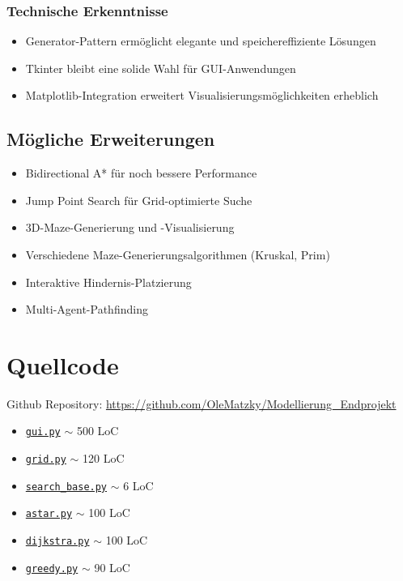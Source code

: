 \documentclass[12pt,a4paper]{article}
\begin{document}
\subsubsection{Technische Erkenntnisse}
\begin{itemize}
    \item Generator-Pattern ermöglicht elegante und speichereffiziente Lösungen
    \item Tkinter bleibt eine solide Wahl für GUI-Anwendungen
    \item Matplotlib-Integration erweitert Visualisierungsmöglichkeiten erheblich
\end{itemize}

\subsection{Mögliche Erweiterungen}
\begin{itemize}
    \item Bidirectional A* für noch bessere Performance
    \item Jump Point Search für Grid-optimierte Suche
    \item 3D-Maze-Generierung und -Visualisierung
    \item Verschiedene Maze-Generierungsalgorithmen (Kruskal, Prim)
    \item Interaktive Hindernis-Platzierung
    \item Multi-Agent-Pathfinding
\end{itemize}

\newpage
\appendix

\section{Quellcode}
Github Repository: \url{https://github.com/OleMatzky/Modellierung_Endprojekt}
\begin{itemize}
    \item \href{https://github.com/OleMatzky/Modellierung_Endprojekt/blob/main/Code/gui.py}{\texttt{gui.py}} $\sim$ 500 LoC
    \item \href{https://github.com/OleMatzky/Modellierung_Endprojekt/blob/main/Code/source/grid.py}{\texttt{grid.py}} $\sim$ 120 LoC
    \item \href{https://github.com/OleMatzky/Modellierung_Endprojekt/blob/main/Code/source/search_base.py}{\texttt{search\_base.py}} $\sim$ 6 LoC
    \item \href{https://github.com/OleMatzky/Modellierung_Endprojekt/blob/main/Code/source/astar.py}{\texttt{astar.py}} $\sim$ 100 LoC
    \item \href{https://github.com/OleMatzky/Modellierung_Endprojekt/blob/main/Code/source/dijkstra.py}{\texttt{dijkstra.py}} $\sim$ 100 LoC
    \item \href{https://github.com/OleMatzky/Modellierung_Endprojekt/blob/main/Code/source/greedy.py}{\texttt{greedy.py}} $\sim$ 90 LoC
\end{itemize}
\end{document}
